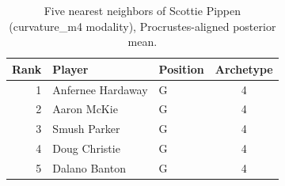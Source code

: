 \begin{table}[htbp]
  \centering\small
  \begin{tabular}{rllc}
    \toprule
    Rank & Player & Position & Archetype \\
    \midrule
    1 & Anfernee Hardaway & G & 4 \\
    2 & Aaron McKie & G & 4 \\
    3 & Smush Parker & G & 4 \\
    4 & Doug Christie & G & 4 \\
    5 & Dalano Banton & G & 4 \\
    \bottomrule
  \end{tabular}
  \caption{Five nearest neighbors of Scottie Pippen (curvature_m4 modality), Procrustes-aligned posterior mean.}
  \label{tab:Scottie_Pippen_neighbors_curvature_m4}
\end{table}

